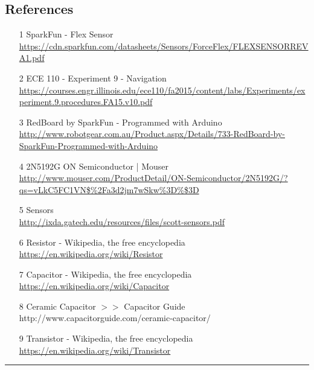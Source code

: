 \documentclass[12pt,a4paper]{article}
\begin{document}
\begin{large}
\section{References}
\begin{itemize}
\item[1] SparkFun - Flex Sensor\\ \url{https://cdn.sparkfun.com/datasheets/Sensors/ForceFlex/FLEXSENSORREVA1.pdf}
\item[2] ECE 110 - Experiment 9 - Navigation\\
\url{https://courses.engr.illinois.edu/ece110/fa2015/content/labs/Experiments/experiment.9.procedures.FA15.v10.pdf}
\item[3] RedBoard by SparkFun - Programmed with Arduino\\
\url{http://www.robotgear.com.au/Product.aspx/Details/733-RedBoard-by-SparkFun-Programmed-with-Arduino}
\item[4]  2N5192G ON Semiconductor | Mouser \\
\url{http://www.mouser.com/ProductDetail/ON-Semiconductor/2N5192G/?qs=vLkC5FC1VN$\%2Fa3d2jm7wSkw\%3D\%$3D}
\item[5] Sensors\\
\url{http://ixda.gatech.edu/resources/files/scott-sensors.pdf}
\item[6] Resistor - Wikipedia, the free encyclopedia\\
\url{https://en.wikipedia.org/wiki/Resistor}
\item[7] Capacitor - Wikipedia, the free encyclopedia\\
\url{https://en.wikipedia.org/wiki/Capacitor}
\item[8] Ceramic Capacitor $>>$ Capacitor Guide\\
http://www.capacitorguide.com/ceramic-capacitor/
\item[9] Transistor - Wikipedia, the free encyclopedia\\
\url{https://en.wikipedia.org/wiki/Transistor}
\end{itemize}

\noindent\rule{18.5cm}{0.4pt}
\end{large} 
\end{document}
